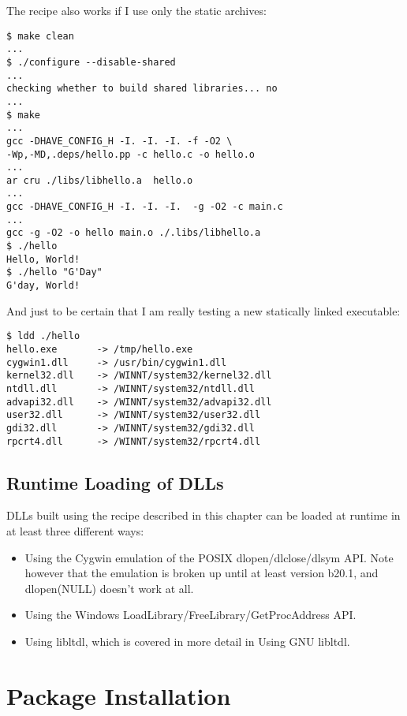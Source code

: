 The recipe also works if I use only the static archives:

\begin{Verbatim}[frame=single]
$ make clean
...
$ ./configure --disable-shared
...
checking whether to build shared libraries... no
...
$ make
...
gcc -DHAVE_CONFIG_H -I. -I. -I. -f -O2 \
-Wp,-MD,.deps/hello.pp -c hello.c -o hello.o
...
ar cru ./libs/libhello.a  hello.o
...
gcc -DHAVE_CONFIG_H -I. -I. -I.  -g -O2 -c main.c
...
gcc -g -O2 -o hello main.o ./.libs/libhello.a
$ ./hello
Hello, World!
$ ./hello "G'Day"
G'day, World!
\end{Verbatim}

And just to be certain that I am really testing a new statically linked executable:

\begin{verbatim}
$ ldd ./hello
hello.exe       -> /tmp/hello.exe
cygwin1.dll     -> /usr/bin/cygwin1.dll
kernel32.dll    -> /WINNT/system32/kernel32.dll
ntdll.dll       -> /WINNT/system32/ntdll.dll
advapi32.dll    -> /WINNT/system32/advapi32.dll
user32.dll      -> /WINNT/system32/user32.dll
gdi32.dll       -> /WINNT/system32/gdi32.dll
rpcrt4.dll      -> /WINNT/system32/rpcrt4.dll
\end{verbatim}

\subsection{Runtime Loading of DLLs}

DLLs built using the recipe described in this chapter can be loaded at runtime in at least three different ways:

\begin{itemize}
    \item Using the Cygwin emulation of the POSIX dlopen/dlclose/dlsym API. Note however that the emulation is broken up until at least version b20.1, and dlopen(NULL) doesn't work at all.

    \item Using the Windows LoadLibrary/FreeLibrary/GetProcAddress API.

    \item Using libltdl, which is covered in more detail in Using GNU libltdl. 
\end{itemize}

\section{Package Installation}

